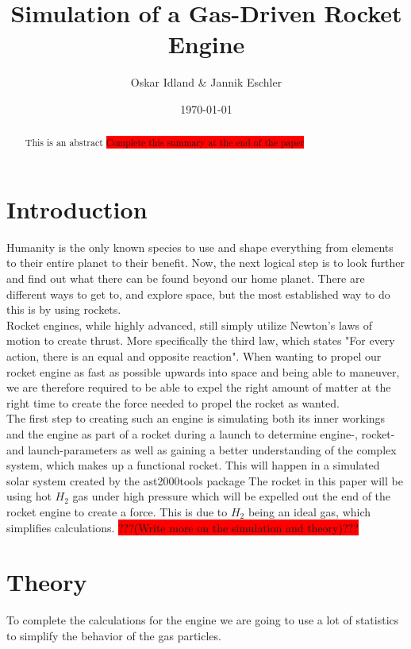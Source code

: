 \documentclass[reprint,english,notitlepage]{revtex4-2}
\begin{document}
\title{Simulation of a Gas-Driven Rocket Engine}
\author{Oskar Idland \& Jannik Eschler}
\date{\today}

\begin{abstract}
This is an abstract \colorbox{red}{Complete this summary at the end of the paper}
\end{abstract}
\maketitle

\section{Introduction}
Humanity is the only known species to use and shape everything from elements to their entire planet to their benefit.
Now, the next logical step is to look further and find out what there can be found beyond our home planet.
There are different ways to get to, and explore space, but the most established way to do this is by using rockets.\\
Rocket engines, while highly advanced, still simply utilize Newton's laws of motion to create thrust.
More specifically the third law, which states "For every action, there is an equal and opposite reaction".
When wanting to propel our rocket engine as fast as possible upwards into space and being able to maneuver, we are therefore required
to be able to expel the right amount of matter at the right time to create the force needed to propel the rocket as wanted.\\
The first step to creating such an engine is simulating both its inner workings and the engine as part of a rocket during a launch to determine engine-, rocket- and launch-parameters
as well as gaining a better understanding of the complex system, which makes up a functional rocket. This will happen in a simulated solar system created by the ast2000tools package
The rocket in this paper will be using hot $ H_2 $ gas under high pressure which will be expelled out the end of the rocket engine to create a force.
This is due to $H_2$ being an ideal gas, which simplifies calculations. \colorbox{red}{???(Write more on the simulation and theory)???}

\section{Theory}
To complete the calculations for the engine we are going to use a lot of statistics to simplify the behavior of the gas particles. 
\end{document}

